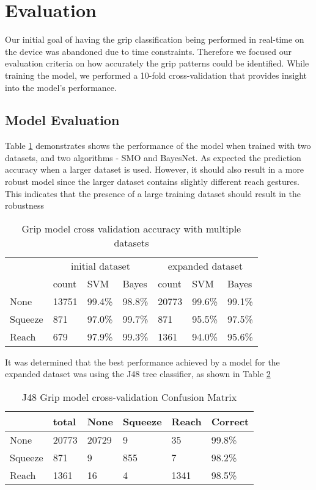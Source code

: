 \section{Evaluation}
Our initial goal of having the grip classification being performed in real-time on the device was abandoned due to time constraints. Therefore we focused our evaluation criteria on how accurately the grip patterns could be identified. While training the model, we performed a 10-fold cross-validation that provides insight into the model's performance. 

\subsection{Model Evaluation}
Table \ref{tbl-Grip Model Eval} demonstrates shows the performance of the model when trained with two datasets, and two algorithms - SMO and BayesNet. As expected the prediction accuracy when a larger dataset is used. However, it should also result in a more robust model since the larger dataset contains slightly different reach gestures.
This indicates that the presence of a large training dataset should result in the robustness 

\begin{table}[!t]
\caption{Grip model cross validation accuracy with multiple datasets}
\label{tbl-Grip Model Eval}
\begin{tabular}{lllllll}
        & \multicolumn{3}{c}{initial dataset} & \multicolumn{3}{c}{expanded dataset} \\
        & count     & SVM        & Bayes      & count     & SVM        & Bayes    \\
None    & 13751     & 99.4\%     & 98.8\%     & 20773     & 99.6\%     & 99.1\%      \\
Squeeze & 871       & 97.0\%     & 99.7\%     & 871       & 95.5\%     & 97.5\%      \\
Reach   & 679       & 97.9\%     & 99.3\%     & 1361      & 94.0\%     & 95.6\%     
\end{tabular}
\end{table}

It was determined that the best performance achieved by a model for the expanded dataset was using the J48 tree classifier, as shown in  Table \ref{tbl-Grip Model J48}

\begin{table}[!t]
\caption{J48 Grip model cross-validation Confusion Matrix}
\label{tbl-Grip Model J48}
\begin{tabular}{|l|l|l|l|l|l|}
\hline
        & total & None  & Squeeze & Reach & Correct \\ \hline
None    & 20773 & 20729 & 9       & 35    & 99.8\%  \\ \hline
Squeeze & 871   & 9     & 855     & 7     & 98.2\%  \\ \hline
Reach   & 1361  & 16    & 4       & 1341  & 98.5\%  \\ \hline
\end{tabular}
\end{table}


